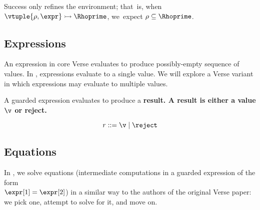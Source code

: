 \documentclass[]{article}
\begin{document}
    \medskip
    

    
    
    
    
    Success only refines the environment; that~is, when
    ${\vtuple{\rho, \expr}} \rightarrowtail{} {\Rhoprime}$, we~expect $\rho \subseteq \Rhoprime$.
    
    

    
    \subsection{Expressions}
    
    \newcommand\GNoTree{\vmrung \rightsquigarrow \uppsidown} 
    
    An expression in core Verse evaluates to produce possibly-empty sequence of
    values. In \VMinus, expressions evaluate to a single value. We will explore
    a Verse variant in which expressions may evaluate to multiple values. 

    

    A guarded expression evaluates to produce a \bf{result}. A result is either
    a value $\v$ or reject. 
    
    \[\it{r} \; \rm{::=} \; \v \;|\; \reject \]
    
    
    
    \bigskip
\subsection{Equations}

In \VMinus, we solve equations (intermediate computations in a guarded
expression of the form \\$\expr[1] = \expr[2]$) in a similar way to the
authors of the original Verse paper: we pick one, attempt to solve for it, and
move on. 
\end{document}
